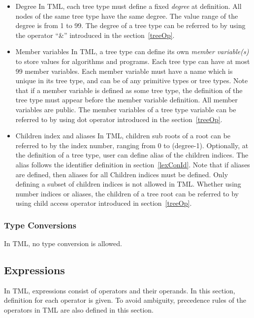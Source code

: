 \documentclass[12pt,psfig,a4]{article}
\begin{document}
\begin{itemize}
\item Degree
In TML, each tree type must define a fixed \textit{degree} at definition. All nodes of the same tree type have the same degree. The value range of the degree is from 1 to 99. The degree of a tree type can be referred to by using  the operator ``\&'' introduced in the section~\ref{treeOp}.


\item Member variables
In TML, a tree type can define its own \textit{member variable(s)} to store values for algorithms and programs. Each tree type can have at most 99 member variables. Each member variable must have a name which is unique in its tree type, and can be of any primitive types or tree types. Note that if a member variable is defined as some tree type, the definition of the tree type must appear before the member variable definition. All member variables are public. The member variables of a tree type variable can be referred to by using dot operator introduced in the section~\ref{treeOp}.


\item Children index and aliases
In TML, children sub roots of a root can be referred to by the index number, ranging from 0 to (degree-1). Optionally, at the definition of a tree type, user can define alias of the children indices. The alias follows the identifier definition in section~\ref{lexConId}. Note that if aliases are defined, then aliases for all Children indices must be defined. Only defining a subset of children indices is not allowed in TML. Whether using number indices or aliases, the children of a tree root can be referred to by using child access operator introduced in section~\ref{treeOp}.

\end{itemize}

\subsubsection {Type Conversions}
In TML, no type conversion is allowed.



\subsection{Expressions}
In TML, expressions consist of operators and their operands. In this section, definition for each operator is given. To avoid ambiguity, precedence rules of the operators in TML are also defined in this section.
\end{document}
